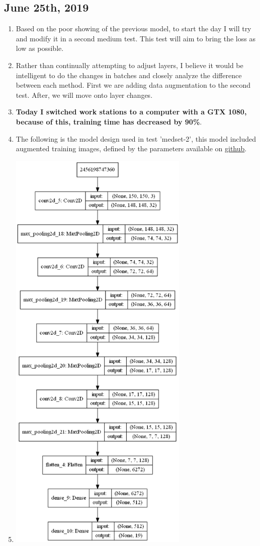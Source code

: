 \documentclass[12pt]{article} %
\begin{document}
\subsection{June 25th, 2019}
\noindent\makebox[\linewidth]{\rule{15cm}{0.4pt}}
\begin{enumerate}[label = (\roman*)]
\item Based on the poor showing of the previous model, to start the day I will try and modify it in a second medium test. This test will aim to bring the loss as low as possible.
\item Rather than continually attempting to adjust layers, I believe it would be intelligent to do the changes in batches and closely analyze the difference between each method. First we are adding data augmentation to the second test. After, we will move onto layer changes.
\item \textbf{Today I switched work stations to a computer with a GTX 1080, because of this, training time has decreased by 90\%}.
\item The following is the model design used in test 'medset-2', this model included augmented training images, defined by the parameters available on \href{https://github.com/mattlm0831/OCR-Handwriting/blob/master/bin/src/testing/convnet-medset-ocr-test2/convnet-medset-ocr-test2.py}{github}.
\item \includegraphics[height = 200mm, scale=.5]{model-medset2}

\end{enumerate}
\end{document}
